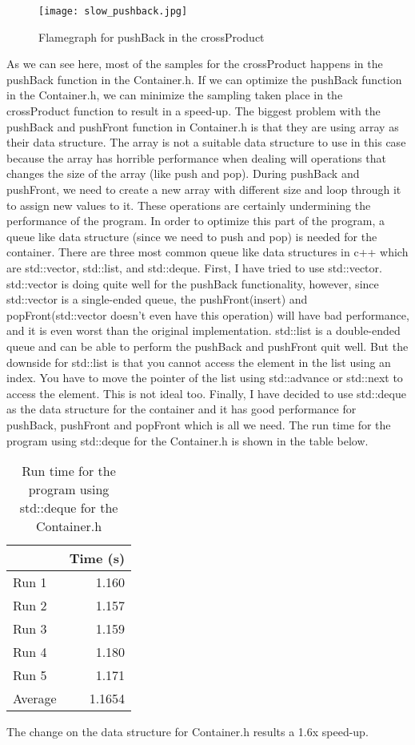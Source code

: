 \documentclass[12pt]{article}
\begin{document}
\begin{figure}[htb!]
  \centering
  \texttt{[image: slow\_pushback.jpg]}
  \caption{Flamegraph for pushBack in the crossProduct}
\end{figure}

\noindent 
As we can see here, most of the samples for the crossProduct happens in the pushBack function in the Container.h. If we can optimize the pushBack function in the Container.h, we can minimize the sampling taken place in the crossProduct function to result in a speed-up. The biggest problem with the pushBack and pushFront function in Container.h is that they are using array as their data structure. The array is not a suitable data structure to use in this case because the array has horrible performance when dealing will operations that changes the size of the array (like push and pop). During pushBack and pushFront, we need to create a new array with different size and loop through it to assign new values to it. These operations are certainly undermining the performance of the program. In order to optimize this part of the program, a queue like data structure (since we need to push and pop) is needed for the container. There are three most common queue like data structures in c++ which are std::vector, std::list, and std::deque. First, I have tried to use std::vector. std::vector is doing quite well for the pushBack functionality, however, since std::vector is a single-ended queue, the pushFront(insert) and popFront(std::vector doesn't even have this operation) will have bad performance, and it is even worst than the original implementation. std::list is a double-ended queue and can be able to perform the pushBack and pushFront quit well. But the downside for std::list is that you cannot access the element in the list using an index. You have to move the pointer of the list using std::advance or std::next to access the element. This is not ideal too. Finally, I have decided to use std::deque as the data structure for the container and it has good performance for pushBack, pushFront and popFront which is all we need. The run time for the program using std::deque for the Container.h is shown in the table below.

\begin{table}[H]
  \centering
  \begin{tabular}{lr}
    & {\bf Time (s)} \\
    \hline
    Run 1 & 1.160 \\
    Run 2 & 1.157 \\
    Run 3 & 1.159 \\
    Run 4 & 1.180 \\
    Run 5 & 1.171 \\
    \hline
    Average & 1.1654 \\
  \end{tabular}
  \caption{Run time for the program using std::deque for the Container.h}
  \label{tbl-fib-sequential}
\end{table}
\noindent 
The change on the data structure for Container.h results a 1.6x speed-up.
\end{document}
